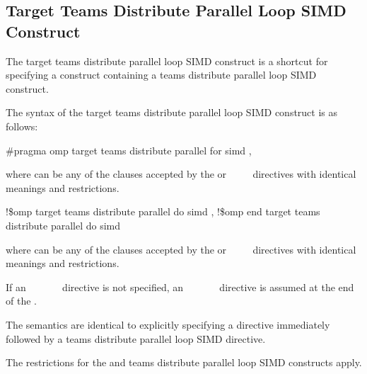\subsection{Target Teams Distribute Parallel Loop SIMD Construct}
\label{subsec:Target Teams Distribute Parallel Loop SIMD Construct}
\summary
The target teams distribute parallel loop SIMD construct is a shortcut for specifying a  
construct containing a teams distribute parallel loop SIMD construct.

\syntax
The syntax of the target teams distribute parallel loop SIMD construct is as follows:

\ccppspecificstart
\begin{boxedcode}[fontsize=\small]
\#pragma omp target teams distribute parallel for simd \plc{[clause[ [},\plc{] clause] ... ]}
\end{boxedcode}

where  can be any of the clauses accepted by the  or 
~~~~
directives with identical meanings and restrictions.
\ccppspecificend

\fortranspecificstart
\begin{boxedcode}
!\$omp target teams distribute parallel do simd \plc{[clause[ [},\plc{] clause] ... ]}
\plc{[}!\$omp end target teams distribute parallel do simd\plc{]}
\end{boxedcode}

where  can be any of the clauses accepted by the 
 or ~~~~
directives with identical meanings and restrictions.

If an ~~~~~~ 
directive is not specified, an 
~~~~~~ 
directive is assumed at the end of the .
\fortranspecificend

\descr
The semantics are identical to explicitly specifying a  directive immediately 
followed by a teams distribute parallel loop SIMD directive.

\restrictions
The restrictions for the  and teams distribute parallel loop SIMD constructs apply.

